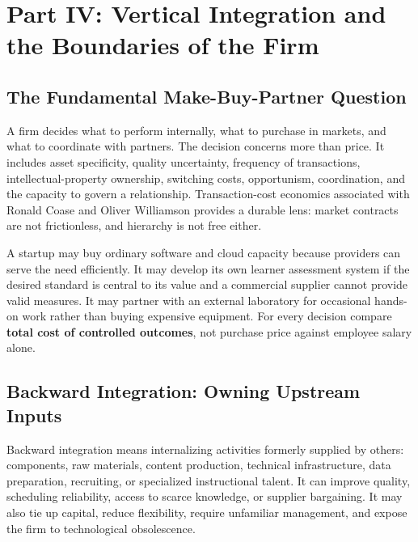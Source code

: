 \section*{Part IV: Vertical Integration and the Boundaries of the Firm}
\label{sec:part4_vertical_integration_boundaries_firm}

\subsection{The Fundamental Make-Buy-Partner Question}
\label{sec:fundamental_make_buy_partner_question}

A firm decides what to perform internally, what to purchase in markets, and what to coordinate with partners. The decision concerns more than price. It includes asset specificity, quality uncertainty, frequency of transactions, intellectual-property ownership, switching costs, opportunism, coordination, and the capacity to govern a relationship. Transaction-cost economics associated with Ronald Coase and Oliver Williamson provides a durable lens: market contracts are not frictionless, and hierarchy is not free either.

A startup may buy ordinary software and cloud capacity because providers can serve the need efficiently. It may develop its own learner assessment system if the desired standard is central to its value and a commercial supplier cannot provide valid measures. It may partner with an external laboratory for occasional hands-on work rather than buying expensive equipment. For every decision compare \textbf{total cost of controlled outcomes}, not purchase price against employee salary alone.

\subsection{Backward Integration: Owning Upstream Inputs}
\label{sec:backward_integration_upstream_inputs}

Backward integration means internalizing activities formerly supplied by others: components, raw materials, content production, technical infrastructure, data preparation, recruiting, or specialized instructional talent. It can improve quality, scheduling reliability, access to scarce knowledge, or supplier bargaining. It may also tie up capital, reduce flexibility, require unfamiliar management, and expose the firm to technological obsolescence.

